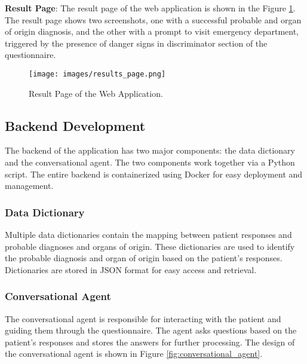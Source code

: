 \noindent \textcolor{TUMRed}{\textbf{Result Page}}: The result page of the web application is shown in the Figure \ref{fig:results_page}. The result page shows two screenshots, one with a successful probable and organ of origin diagnosis, and the other with a prompt to visit emergency department, triggered by the presence of danger signs in discriminator section of the questionnaire.
\begin{figure}[H]
    \centering
    \texttt{[image: images/results\_page.png]}
    \caption{Result Page of the Web Application.}
    \label{fig:results_page}
\end{figure}


\subsection{Backend Development}
The backend of the application has two major components: the data dictionary and the conversational agent. The two components work together via a Python script. The entire backend is containerized using Docker for easy deployment and management.

\subsubsection{Data Dictionary}
Multiple data dictionaries contain the mapping between patient responses and probable diagnoses and organs of origin. These dictionaries are used to identify the probable diagnosis and organ of origin based on the patient's responses. Dictionaries are stored in JSON format for easy access and retrieval.
\subsubsection{Conversational Agent}
The conversational agent is responsible for interacting with the patient and guiding them through the questionnaire. The agent asks questions based on the patient's responses and stores the answers for further processing. The design of the conversational agent is shown in Figure \ref{fig:conversational_agent}.

